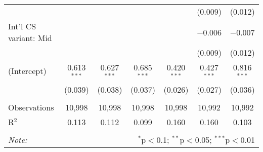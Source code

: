 \begin{tabular}{@{\extracolsep{5pt}}lcccccc}
  &  &  &  &  & (0.009) & (0.012) \\ 
  Int'l CS variant: Mid &  &  &  &  & $-$0.006 & $-$0.007 \\ 
  &  &  &  &  & (0.009) & (0.012) \\ 
  (Intercept) & 0.613$^{***}$ & 0.627$^{***}$ & 0.685$^{***}$ & 0.420$^{***}$ & 0.427$^{***}$ & 0.816$^{***}$ \\ 
  & (0.039) & (0.038) & (0.037) & (0.026) & (0.027) & (0.036) \\ 
 \hline \\[-1.8ex] 
Observations & 10,998 & 10,998 & 10,998 & 10,998 & 10,992 & 10,992 \\ 
R$^{2}$ & 0.113 & 0.112 & 0.099 & 0.160 & 0.160 & 0.103 \\ 
\hline 
\hline \\[-1.8ex] 
\textit{Note:}  & \multicolumn{6}{r}{$^{*}$p$<$0.1; $^{**}$p$<$0.05; $^{***}$p$<$0.01} \\ 
\end{tabular} 
